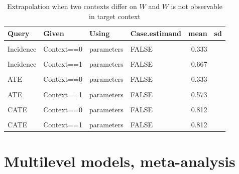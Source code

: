 \documentclass[
  12pt,
]{book}
\begin{document}
\begin{table}

\caption{\label{tab:appev4}Extrapolation when two contexts differ on $W$ and $W$ is not observable in target context}
\centering
\begin{tabular}[t]{llllrr}
\toprule
Query & Given & Using & Case.estimand & mean & sd\\
\midrule
\cellcolor{gray!6}{Incidence} & \cellcolor{gray!6}{Context==0} & \cellcolor{gray!6}{posteriors} & \cellcolor{gray!6}{FALSE} & \cellcolor{gray!6}{0.329} & \cellcolor{gray!6}{0.007}\\
Incidence & Context==0 & parameters & FALSE & 0.333 & \\
\cellcolor{gray!6}{Incidence} & \cellcolor{gray!6}{Context==1} & \cellcolor{gray!6}{posteriors} & \cellcolor{gray!6}{FALSE} & \cellcolor{gray!6}{0.667} & \cellcolor{gray!6}{0.007}\\
Incidence & Context==1 & parameters & FALSE & 0.667 & \\
\cellcolor{gray!6}{ATE} & \cellcolor{gray!6}{Context==0} & \cellcolor{gray!6}{posteriors} & \cellcolor{gray!6}{FALSE} & \cellcolor{gray!6}{0.314} & \cellcolor{gray!6}{0.012}\\
\addlinespace
ATE & Context==0 & parameters & FALSE & 0.333 & \\
\cellcolor{gray!6}{ATE} & \cellcolor{gray!6}{Context==1} & \cellcolor{gray!6}{posteriors} & \cellcolor{gray!6}{FALSE} & \cellcolor{gray!6}{0.560} & \cellcolor{gray!6}{0.009}\\
ATE & Context==1 & parameters & FALSE & 0.573 & \\
\cellcolor{gray!6}{CATE} & \cellcolor{gray!6}{Context==0} & \cellcolor{gray!6}{posteriors} & \cellcolor{gray!6}{FALSE} & \cellcolor{gray!6}{0.801} & \cellcolor{gray!6}{0.009}\\
CATE & Context==0 & parameters & FALSE & 0.812 & \\
\addlinespace
\cellcolor{gray!6}{CATE} & \cellcolor{gray!6}{Context==1} & \cellcolor{gray!6}{posteriors} & \cellcolor{gray!6}{FALSE} & \cellcolor{gray!6}{0.801} & \cellcolor{gray!6}{0.009}\\
CATE & Context==1 & parameters & FALSE & 0.812 & \\
\bottomrule
\end{tabular}
\end{table}

\hypertarget{multilevel-models-meta-analysis}{%
\section{Multilevel models, meta-analysis}\label{multilevel-models-meta-analysis}}
\end{document}
